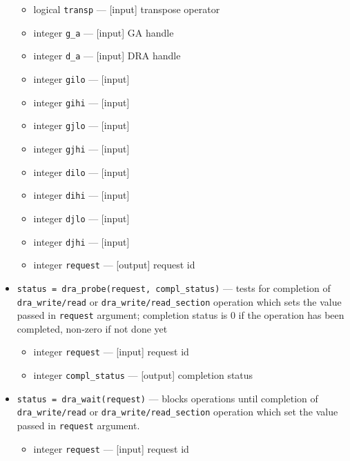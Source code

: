 \begin{itemize}
\begin{itemize}
\item              logical {\tt transp} ---               [input]  transpose operator
\item             integer {\tt g\_a} ---                  [input]  GA handle
\item              integer {\tt d\_a} ---                  [input]  DRA handle
\item              integer {\tt gilo} ---                 [input]
\item              integer {\tt gihi} ---                 [input]
\item              integer {\tt gjlo} ---                 [input]
\item              integer {\tt gjhi} ---                 [input]
\item              integer {\tt dilo} ---                 [input]
\item              integer {\tt dihi} ---                 [input]
\item              integer {\tt djlo} ---                 [input]
\item              integer {\tt djhi} ---                 [input]
\item              integer {\tt request} ---              [output]  request id
\end{itemize}

\item {\tt status = dra\_probe(request, compl\_status)} ---
	      tests for completion of {\tt dra\_write/read} or
	      {\tt dra\_write/read\_section} operation which sets the value
	      passed in {\tt request} argument;
              completion status is 0 if the operation has been completed, non-zero
              if not done yet

\begin{itemize}
\item              integer {\tt request} ---   [input]   request id
\item              integer {\tt compl\_status} --- [output] completion status  
\end{itemize}

\item {\tt status = dra\_wait(request)} --- 
	      blocks operations until completion of {\tt dra\_write/read} or
	      {\tt dra\_write/read\_section} operation which set the value
	      passed in {\tt request} argument. 

\begin{itemize}
\item              integer {\tt request} ---   [input]   request id
\end{itemize}


\end{itemize}
